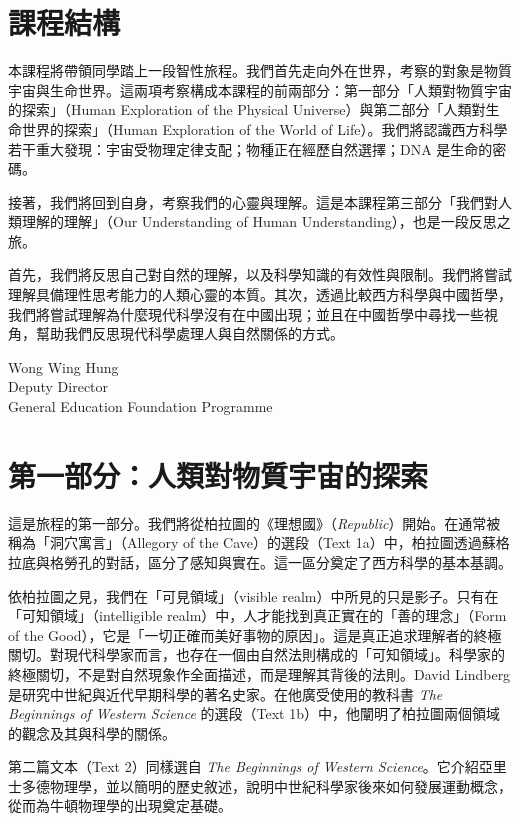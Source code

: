\documentclass[UTF8,zihao=-4]{ctexart}
\begin{document}
\section*{課程結構}
\noindent 本課程將帶領同學踏上一段智性旅程。我們首先走向外在世界，考察的對象是物質宇宙與生命世界。這兩項考察構成本課程的前兩部分：第一部分「人類對物質宇宙的探索」（Human Exploration of the Physical Universe）與第二部分「人類對生命世界的探索」（Human Exploration of the World of Life）。我們將認識西方科學若干重大發現：宇宙受物理定律支配；物種正在經歷自然選擇；DNA 是生命的密碼。

\noindent 接著，我們將回到自身，考察我們的心靈與理解。這是本課程第三部分「我們對人類理解的理解」（Our Understanding of Human Understanding），也是一段反思之旅。

\noindent 首先，我們將反思自己對自然的理解，以及科學知識的有效性與限制。我們將嘗試理解具備理性思考能力的人類心靈的本質。其次，透過比較西方科學與中國哲學，我們將嘗試理解為什麼現代科學沒有在中國出現；並且在中國哲學中尋找一些視角，幫助我們反思現代科學處理人與自然關係的方式。

\vspace{1em}

\noindent Wong Wing Hung\\
Deputy Director\\
General Education Foundation Programme

\section*{第一部分：人類對物質宇宙的探索}
\noindent 這是旅程的第一部分。我們將從柏拉圖的《理想國》（\textit{Republic}）開始。在通常被稱為「洞穴寓言」（Allegory of the Cave）的選段（Text 1a）中，柏拉圖透過蘇格拉底與格勞孔的對話，區分了感知與實在。這一區分奠定了西方科學的基本基調。

\noindent 依柏拉圖之見，我們在「可見領域」（visible realm）中所見的只是影子。只有在「可知領域」（intelligible realm）中，人才能找到真正實在的「善的理念」（Form of the Good），它是「一切正確而美好事物的原因」。這是真正追求理解者的終極關切。對現代科學家而言，也存在一個由自然法則構成的「可知領域」。科學家的終極關切，不是對自然現象作全面描述，而是理解其背後的法則。David Lindberg 是研究中世紀與近代早期科學的著名史家。在他廣受使用的教科書 \textit{The Beginnings of Western Science} 的選段（Text 1b）中，他闡明了柏拉圖兩個領域的觀念及其與科學的關係。

\noindent 第二篇文本（Text 2）同樣選自 \textit{The Beginnings of Western Science}。它介紹亞里士多德物理學，並以簡明的歷史敘述，說明中世紀科學家後來如何發展運動概念，從而為牛頓物理學的出現奠定基礎。
\end{document}
